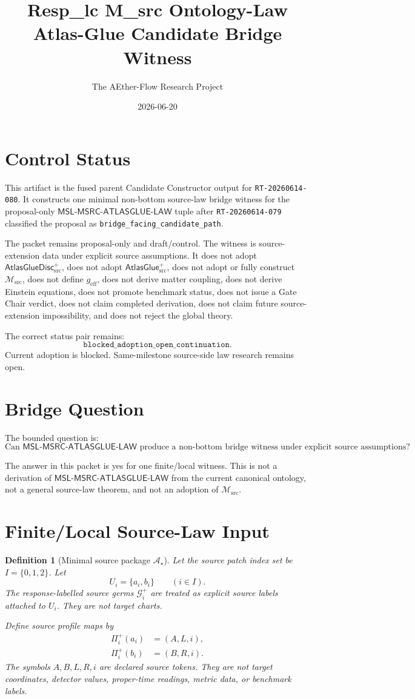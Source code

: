 \documentclass[11pt]{article}
\title{Resp\_lc M\_src Ontology-Law Atlas-Glue Candidate Bridge Witness}
\author{The AEther-Flow Research Project}
\date{2026-06-20}
\newcommand{\Msrc}{\mathcal{M}_{\mathrm{src}}}
\newcommand{\geff}{g_{\mathrm{eff}}}
\newcommand{\AtlasGlue}{\mathsf{AtlasGlue}_{\mathrm{src}}^{+}}
\newcommand{\AtlasGlueDisc}{\mathsf{AtlasGlueDisc}_{\mathrm{src}}^{+}}
\newcommand{\MSL}{\mathsf{MSL}\mbox{-}\mathsf{MSRC}\mbox{-}\mathsf{ATLASGLUE}\mbox{-}\mathsf{LAW}}
\newcommand{\Germ}{\mathcal{G}^{+}}
\newcommand{\Prof}{\Pi^{+}}
\newcommand{\Astar}{\mathcal A_{\star}}
\newtheorem{definition}{Definition}
\begin{document}
\maketitle

\section*{Control Status}

This artifact is the fused parent Candidate Constructor output for
\texttt{RT-20260614-080}. It constructs one minimal non-bottom
source-law bridge witness for the proposal-only \(\MSL\) tuple after
\texttt{RT-20260614-079} classified the proposal as
\texttt{bridge\_facing\_candidate\_path}.

The packet remains proposal-only and draft/control. The witness is
source-extension data under explicit source assumptions. It does not adopt
\(\AtlasGlueDisc\), does not adopt \(\AtlasGlue\), does not adopt or fully
construct \(\Msrc\), does not define \(\geff\), does not derive matter
coupling, does not derive Einstein equations, does not promote benchmark
status, does not issue a Gate Chair verdict, does not claim completed
derivation, does not claim future source-extension impossibility, and does
not reject the global theory.

The correct status pair remains:
\[
  \texttt{blocked\_adoption\_open\_continuation}.
\]
Current adoption is blocked. Same-milestone source-side law research remains
open.

\section{Bridge Question}

The bounded question is:
\[
  \text{Can }\MSL\text{ produce a non-bottom bridge witness under explicit
  source assumptions?}
\]

The answer in this packet is yes for one finite/local witness. This is not a
derivation of \(\MSL\) from the current canonical ontology, not a general
source-law theorem, and not an adoption of \(\Msrc\).

\section{Finite/Local Source-Law Input}

\begin{definition}[Minimal source package \(\Astar\)]
Let the source patch index set be \(I=\{0,1,2\}\). Let
\[
  U_i=\{a_i,b_i\}
  \qquad (i\in I).
\]
The response-labelled source germs \(\Germ_i\) are treated as explicit
source labels attached to \(U_i\). They are not target charts.

Define source profile maps by
\[
\begin{aligned}
\Prof_i(a_i)&=(A,L,i),\\
\Prof_i(b_i)&=(B,R,i).
\end{aligned}
\]
The symbols \(A,B,L,R,i\) are declared source tokens. They are not target
coordinates, detector values, proper-time readings, metric data, or
benchmark labels.
\end{definition}
\end{document}
